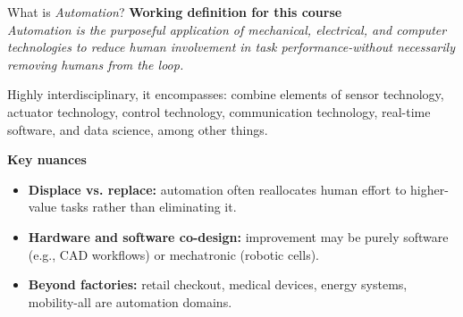 \begin{frame}{What is \textit{Automation}?}
\textbf{Working definition for this course}\\[2mm]
\emph{Automation is the purposeful application of mechanical, electrical, and computer technologies to reduce human involvement in task performance-without necessarily removing humans from the loop.}

Highly interdisciplinary, it encompasses: combine elements of sensor technology, actuator technology, control technology, communication technology, real-time software, and data science, among other things.

\vspace{2mm}
\textbf{Key nuances}
\begin{itemize}
  \item \textbf{Displace vs. replace:} automation often reallocates human effort to higher-value tasks rather than eliminating it.
  \item \textbf{Hardware and software co-design:} improvement may be purely software (e.g., CAD workflows) or mechatronic (robotic cells).
  \item \textbf{Beyond factories:} retail checkout, medical devices, energy systems, mobility-all are automation domains.
\end{itemize}

\end{frame}

